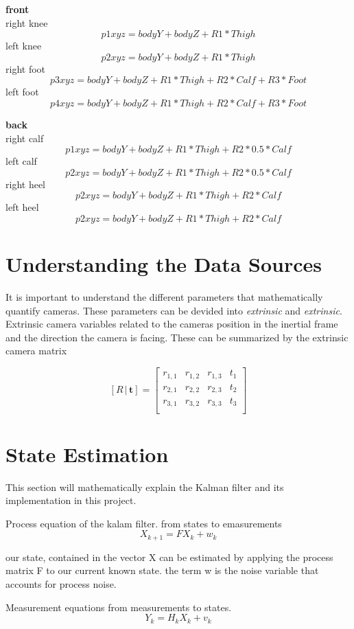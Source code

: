 \textbf{front}\\
right knee
$$ p1xyz = bodyY + bodyZ + R1 * Thigh $$
left knee
$$ p2xyz = bodyY + bodyZ + R1 * Thigh $$
right foot
$$ p3xyz = bodyY + bodyZ + R1 * Thigh + R2 * Calf + R3 * Foot $$
left foot
$$ p4xyz = bodyY + bodyZ + R1 * Thigh + R2 * Calf + R3 * Foot $$

\textbf{back}\\
right calf
$$ p1xyz = bodyY + bodyZ + R1 * Thigh + R2 * 0.5 * Calf $$
left calf
$$ p2xyz = bodyY + bodyZ + R1 * Thigh + R2 * 0.5 * Calf $$
right heel
$$ p2xyz = bodyY + bodyZ + R1 * Thigh + R2 * Calf $$
left heel
$$ p2xyz = bodyY + bodyZ + R1 * Thigh + R2 * Calf $$

\section{Understanding the Data Sources}

It is important to understand the different parameters that mathematically quantify cameras. These parameters can be devided into \textit{extrinsic} and \textit{extrinsic}. Extrinsic camera variables related to the cameras position in the inertial frame and the direction the camera is facing. These can be summarized by the extrinsic camera matrix 

$$[ R \, |\, \boldsymbol{t}] = 
\left[ \begin{array}{ccc|c} 
r_{1,1} & r_{1,2} & r_{1,3} & t_1 \\
r_{2,1} & r_{2,2} & r_{2,3} & t_2 \\
r_{3,1} & r_{3,2} & r_{3,3} & t_3 \\
\end{array} \right]$$



\section{State Estimation}
This section will mathematically explain the Kalman filter and its implementation in this project.

Process equation of the kalam filter.
from states to emasurements
$$ X_{k+1} = FX_{k} + w_{k}  $$

our state, contained in the vector X can be estimated by applying the process matrix F to our current known state. the term w is the noise variable that accounts for process noise.

Measurement equations
from measurements to states.
$$ Y_k = H_{k}X_{k} + v_{k} $$

